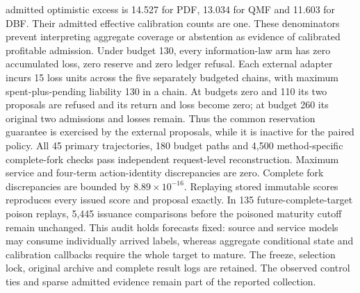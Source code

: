 admitted optimistic excess is 14.527 for PDF, 13.034 for QMF and 11.603 
for DBF. Their admitted effective calibration counts are one. These 
denominators prevent interpreting aggregate coverage or abstention as 
evidence of calibrated profitable admission.
Under budget 130, every information-law arm has zero accumulated loss, 
zero reserve and zero ledger refusal. Each external adapter incurs 15 
loss units across the five separately budgeted chains, with maximum 
spent-plus-pending liability 130 in a chain. At budgets zero and 110 its 
two proposals are refused and its return and loss become zero; at budget 
260 its original two admissions and losses remain. Thus the common 
reservation guarantee is exercised by the external proposals, while it 
is inactive for the paired policy.
All 45 primary trajectories, 180 budget paths and 4,500 method-specific 
complete-fork checks pass independent request-level reconstruction. 
Maximum service and four-term action-identity discrepancies are zero. 
Complete fork discrepancies are bounded by $8.89\times10^{-16}$. 
Replaying stored immutable scores reproduces every issued score 
and proposal exactly. In 135 future-complete-target poison replays, 
5,445 issuance comparisons before the poisoned maturity cutoff remain 
unchanged. This audit holds forecasts fixed: source and service models 
may consume individually arrived labels, whereas aggregate conditional 
state and calibration callbacks require the whole target to mature. 
The freeze, selection lock, original archive and complete result logs 
are retained. The observed control ties and sparse admitted evidence 
remain part of the reported collection.
